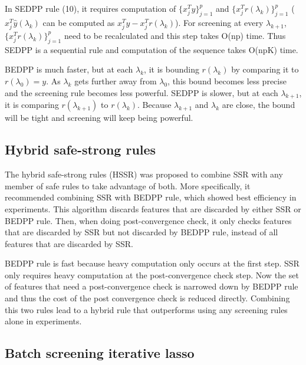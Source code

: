 \documentclass{article}
\begin{document}
In SEDPP rule (10), it requires computation of $\{x_j^Ty\}_{j=1}^p$ and $\{x_j^Tr(\lambda_k)\}_{j=1}^p$ ($x_j^T\hat{y}(\lambda_k)$ can be computed as $x_j^Ty-x_j^Tr(\lambda_k)$). For screening at every $\lambda_{k+1}$, $\{x_j^Tr(\lambda_k)\}_{j=1}^p$ need to be recalculated and this step takes O(np) time. Thus SEDPP is a sequential rule and computation of the sequence takes O(npK) time.

BEDPP is much faster, but at each $\lambda_k$, it is bounding $r(\lambda_k)$ by comparing it to $r(\lambda_0)=y$. As $\lambda_k$ gets further away from $\lambda_0$, this bound becomes less precise and the screening rule becomes less powerful. SEDPP is slower, but at each $\lambda_{k+1}$, it is comparing $r(\lambda_{k+1})$ to $r(\lambda_k)$. Because $\lambda_{k+1}$ and $\lambda_k$ are close, the bound will be tight and screening will keep being powerful.

\subsection{Hybrid safe-strong rules}

The hybrid safe-strong rules (HSSR) \cite{zeng2017efficient} was proposed to combine SSR with any member of safe rules to take advantage of both. More specifically, it recommended  combining SSR with BEDPP rule, which showed best efficiency in experiments. This algorithm discards features that are discarded by either SSR or BEDPP rule. Then, when doing post-convergence check, it only checks features that are discarded by SSR but not discarded by BEDPP rule, instead of all features that are discarded by SSR.

BEDPP rule is fast because heavy computation only occurs at the first step. SSR only requires heavy computation at the post-convergence check step. Now the set of features that need a post-convergence check is narrowed down by BEDPP rule and thus the cost of the post convergence check is reduced directly. Combining this two rules lead to a hybrid rule that outperforms using any screening rules alone in experiments.

\subsection{Batch screening iterative lasso}
\end{document}

